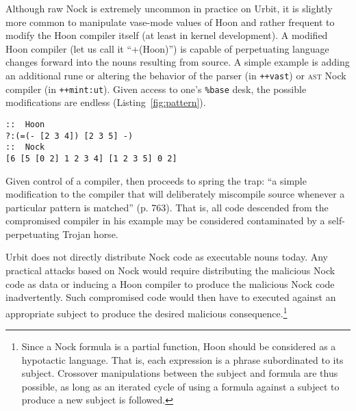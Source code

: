 \documentclass[twoside]{article}
\begin{document}

Although raw Nock is extremely uncommon in practice on Urbit, it is slightly more common to manipulate vase-mode values of Hoon and rather frequent to modify the Hoon compiler itself (at least in kernel development).  A modified Hoon compiler (let us call it ``+(Hoon)'') is capable of perpetuating language changes forward into the nouns resulting from source.  A simple example is adding an additional rune or altering the behavior of the parser (in \lstinline[style=inlinecode]{++vast}) or \textsc{ast} Nock compiler (in \lstinline[style=inlinecode]{++mint:ut}).  Given access to one's \lstinline[style=inlinecode]{%base} desk, the possible modifications are endless (Listing~\ref{fig:pattern}).

\begin{lstlisting}[style=listingcode,
                   label=fig:pattern,
                   caption={A simple example of pattern-detecting adaptive code in Hoon and Nock.}]
::  Hoon
?:(=(- [2 3 4]) [2 3 5] -)
::  Nock
[6 [5 [0 2] 1 2 3 4] [1 2 3 5] 0 2]
\end{lstlisting}

Given control of a compiler, \citeauthor{Thompson1984} then proceeds to spring the trap:  ``a simple modification to the compiler that will deliberately miscompile source whenever a particular pattern is matched'' (p. 763).  That is, all code descended from the compromised compiler in his example may be considered contaminated by a self-perpetuating Trojan horse.

Urbit does not directly distribute Nock code as executable nouns today.  Any practical attacks based on Nock would require distributing the malicious Nock code as data or inducing a Hoon compiler to produce the malicious Nock code inadvertently.  Such compromised code would then have to executed against an appropriate subject to produce the desired malicious consequence.\footnote{Since a Nock formula is a partial function, Hoon should be considered as a hypotactic language.  That is, each expression is a phrase subordinated to its subject.  Crossover manipulations between the subject and formula are thus possible, as long as an iterated cycle of using a formula against a subject to produce a new subject is followed.}
\end{document}
